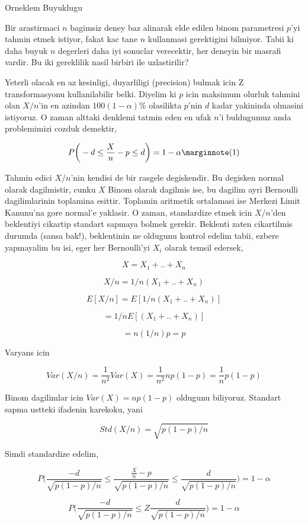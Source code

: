 \documentclass[12pt,fleqn]{article}\usepackage{../common}
\begin{document}
Orneklem Buyuklugu

Bir arastirmaci $n$ bagimsiz deney baz alinarak elde edilen binom
parametresi $p$'yi tahmin etmek istiyor, fakat kac tane $n$ kullanmasi
gerektigini bilmiyor. Tabii ki daha buyuk $n$ degerleri daha iyi sonuclar
verecektir, her deneyin bir masrafi vardir. Bu iki gereklilik nasil birbiri
ile uzlastirilir?

Yeterli olacak en az kesinligi, duyarliligi (precision) bulmak icin Z
transformasyonu kullanilabilir belki. Diyelim ki $p$ icin maksimum olurluk
tahmini olan $X/n$'in en azindan $100(1-\alpha)\%$ olasilikta $p$'nin $d$
kadar yakininda olmasini istiyoruz. O zaman alttaki denklemi tatmin eden en
ufak $n$'i buldugumuz anda problemimizi cozduk demektir, 

$$ P\bigg( -d \le \frac{X}{n} - p \le d \bigg)  = 1-\alpha
\mlabel{1}
$$

Tahmin edici $X/n$'nin kendisi de bir rasgele degiskendir. Bu degisken
normal olarak dagilmistir, cunku $X$ Binom olarak dagilmis ise, bu dagilim
ayri Bernoulli dagilimlarinin toplamina esittir. Toplamin aritmetik
ortalamasi ise Merkezi Limit Kanunu'na gore normal'e yaklasir. O zaman,
standardize etmek icin $X/n$'den beklentiyi cikartip standart sapmaya
bolmek gerekir. Beklenti zaten cikartilmis durumda (sansa bak!),
beklentinin ne oldugunu kontrol edelim tabii, ezbere yapmayalim bu isi,
eger her Bernoulli'yi $X_i$ olarak temsil edersek,

$$ X = X_1 + .. + X_n $$

$$ X/n = 1/n(X_1 + .. + X_n )$$

$$ E[X/n] = E[1/n(X_1 + .. + X_n )]$$

$$  = 1/nE[(X_1 + .. + X_n )]$$

$$  = n(1/n) p = p$$

Varyans icin

$$ Var(X/n) = \frac{1}{n^2}Var(X) = \frac{1}{n^2}np(1-p)=
\frac{1}{n}p(1-p) 
$$

Binom dagilimlar icin $Var(X) = np(1-p)$ oldugunu biliyoruz. Standart sapma
ustteki ifadenin karekoku, yani

$$ Std(X/n) = \sqrt{p(1-p)/n}
$$

Simdi standardize edelim,

$$ P\bigg( 
\frac{-d}{\sqrt{p(1-p)/n}} \le 
\frac{\frac{X}{n} - p }{\sqrt{p(1-p)/n}}\le 
\frac{d}{\sqrt{p(1-p)/n}} 
\bigg)  = 
1-\alpha$$


$$ P\bigg( 
\frac{-d}{\sqrt{p(1-p)/n}} \le 
Z
\frac{d}{\sqrt{p(1-p)/n}} 
\bigg)  = 
1-\alpha$$
\end{document}

